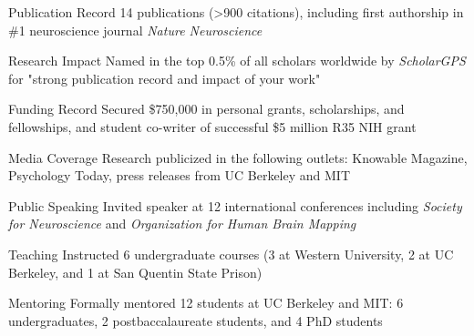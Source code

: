 

\begin{cvskills}

\cvskill
   {Publication Record}
   {14 publications (>900 citations), including first authorship in \#1 neuroscience journal \textit{Nature Neuroscience}}  
   
\cvskill
   {Research Impact}
   {Named in the top 0.5\% of all scholars worldwide by \textit{ScholarGPS} for "strong publication record and impact of your work"}    
   
\cvskill
   {Funding Record}
   {Secured \$750,000 in personal grants, scholarships, and fellowships, and student co-writer of successful \$5 million R35 NIH grant}    
 
 \cvskill
   {Media Coverage}
   {Research publicized in the following outlets: Knowable Magazine, Psychology Today, press releases from UC Berkeley and MIT}
   
\cvskill
   {Public Speaking}
   {Invited speaker at 12 international conferences including \textit{Society for Neuroscience} and \textit{Organization for Human Brain Mapping}} 
   
\cvskill
   {Teaching}
   {Instructed 6 undergraduate courses (3 at Western University, 2 at UC Berkeley, and 1 at San Quentin State Prison)} 
   
\cvskill
   {Mentoring}
   {Formally mentored 12 students at UC Berkeley and MIT: 6 undergraduates, 2 postbaccalaureate students, and 4 PhD students} 

\end{cvskills}
